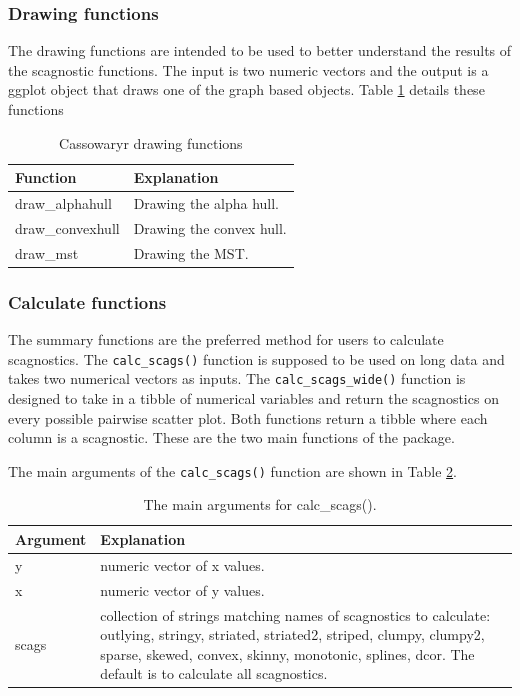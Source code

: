 \subsubsection{Drawing functions}\label{drawing-functions}

The drawing functions are intended to be used to better understand the results of the scagnostic functions. The input is two numeric vectors and the output is a ggplot object that draws one of the graph based objects. Table \ref{tab:drawfuncs-tb-pdf} details these functions

\begin{table}

\caption{\label{tab:drawfuncs-tb-pdf}Cassowaryr drawing functions}
\centering
\begin{tabular}[t]{>{\raggedright\arraybackslash}p{3cm}l}
\toprule
Function & Explanation\\
\midrule
draw\_alphahull & Drawing the alpha hull.\\
draw\_convexhull & Drawing the convex hull.\\
draw\_mst & Drawing the MST.\\
\bottomrule
\end{tabular}
\end{table}

\subsubsection{Calculate functions}\label{calculate-functions}

The summary functions are the preferred method for users to calculate scagnostics. The \texttt{calc\_scags()} function is supposed to be used on long data and takes two numerical vectors as inputs. The \texttt{calc\_scags\_wide()} function is designed to take in a tibble of numerical variables and return the scagnostics on every possible pairwise scatter plot. Both functions return a tibble where each column is a scagnostic. These are the two main functions of the package.

The main arguments of the \texttt{calc\_scags()} function are shown in Table \ref{tab:calcfunc-tb-pdf}.

\begin{table}

\caption{\label{tab:calcfunc-tb-pdf}The main arguments for calc\_scags().}
\centering
\begin{tabular}[t]{l>{\raggedright\arraybackslash}p{12cm}}
\toprule
Argument & Explanation\\
\midrule
y & numeric vector of x values.\\
x & numeric vector of y values.\\
scags & collection of strings matching names of scagnostics to calculate: outlying, stringy, striated, striated2, striped, clumpy, clumpy2, sparse, skewed, convex, skinny, monotonic, splines, dcor. The default is to calculate all scagnostics.\\
\bottomrule
\end{tabular}
\end{table}

